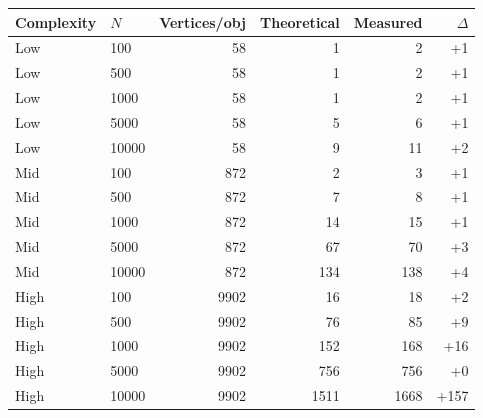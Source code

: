 \begin{tabular}{llrrrr}
  \toprule
  Complexity & $N$ & Vertices/obj & Theoretical & Measured & $\Delta$ \\
  \midrule
  Low &    100 &    58 &      1 &      2 &    +1 \\
  Low &    500 &    58 &      1 &      2 &    +1 \\
  Low &   1000 &    58 &      1 &      2 &    +1 \\
  Low &   5000 &    58 &      5 &      6 &    +1 \\
  Low &  10000 &    58 &      9 &     11 &    +2 \\
  \midrule
  Mid &    100 &   872 &      2 &      3 &    +1 \\
  Mid &    500 &   872 &      7 &      8 &    +1 \\
  Mid &   1000 &   872 &     14 &     15 &    +1 \\
  Mid &   5000 &   872 &     67 &     70 &    +3 \\
  Mid &  10000 &   872 &    134 &    138 &    +4 \\
  \midrule
  High &    100 &  9902 &     16 &     18 &    +2 \\
  High &    500 &  9902 &     76 &     85 &    +9 \\
  High &   1000 &  9902 &    152 &    168 &   +16 \\
  High &   5000 &  9902 &    756 &    756 &    +0 \\
  High &  10000 &  9902 &   1511 &   1668 &  +157 \\
  \bottomrule
\end{tabular}
